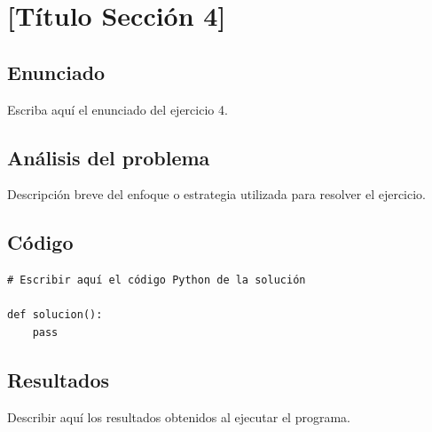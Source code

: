 
\section{[Título Sección 4]}

\subsection*{Enunciado}

\begin{tcolorbox}[colback=gray!8, colframe=gray!50, title=Ejercicio 4]
    Escriba aquí el enunciado del ejercicio 4.
\end{tcolorbox}

\subsection{Análisis del problema}

Descripción breve del enfoque o estrategia utilizada para resolver el ejercicio.

\subsection{Código}

\begin{lstlisting}[caption={Solución ejercicio 4}, label={lst:ej4}]
# Escribir aquí el código Python de la solución

def solucion():
    pass
\end{lstlisting}

\subsection{Resultados}

\begin{respuesta}
    Describir aquí los resultados obtenidos al ejecutar el programa.
\end{respuesta}


\newpage
